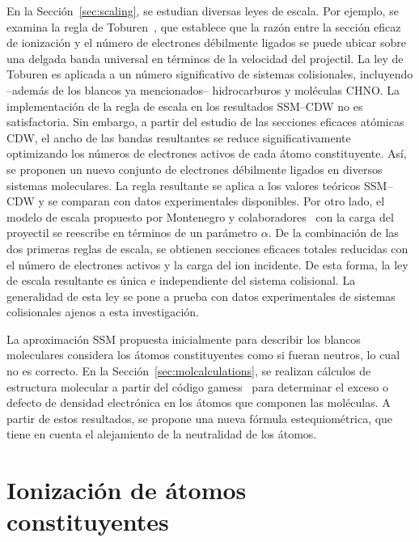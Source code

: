 En la Sección~\ref{sec:scaling}, se estudian diversas leyes de escala. 
Por ejemplo, se examina la regla de Toburen~\cite{Toburen:75,
Toburen:76}, que establece que la razón entre la sección eficaz de 
ionización y el número de electrones débilmente ligados se puede ubicar 
sobre una delgada banda universal en términos de la velocidad del 
projectil. La ley de Toburen es aplicada a un número significativo de 
sistemas colisionales, incluyendo --además de los blancos ya mencionados-- 
hidrocarburos y moléculas CHNO. La implementación de la regla de escala 
en los resultados SSM--CDW no es satisfactoria. Sin embargo, a partir 
del estudio de las secciones eficaces atómicas CDW, el ancho de las 
bandas resultantes se reduce significativamente optimizando los números 
de electrones activos de cada átomo constituyente. Así, se proponen un 
nuevo conjunto de electrones débilmente ligados en diversos sistemas 
moleculares. La regla resultante se aplica a los valores teóricos 
SSM--CDW y se comparan con datos experimentales disponibles. Por otro 
lado, el modelo de escala propuesto por Montenegro y 
colaboradores~\cite{Dubois:13,Montenegro:13} con la carga del proyectil 
se reescribe en términos de un parámetro $\alpha$. De la combinación de 
las dos primeras reglas de escala, se obtienen secciones eficaces 
totales reducidas con el número de electrones activos y la carga del 
ion incidente. De esta forma, la ley de escala resultante es única e 
independiente del sistema colisional. La generalidad de esta ley se pone 
a prueba con datos experimentales de sistemas colisionales ajenos a esta 
investigación.

La aproximación SSM propuesta inicialmente para describir los blancos 
moleculares considera los átomos constituyentes como si fueran 
neutros, lo cual no es correcto. En la Sección~\ref{sec:molcalculations}, 
se realizan cálculos de estructura molecular a partir del código 
{\sc gamess}~\cite{gamess} para determinar el exceso o defecto de 
densidad electrónica en los átomos que componen las moléculas. A partir 
de estos resultados, se propone una nueva fórmula estequiométrica, que 
tiene en cuenta el alejamiento de la neutralidad de los átomos. 

\section{Ionización de átomos constituyentes}
\label{sec:atoms}

